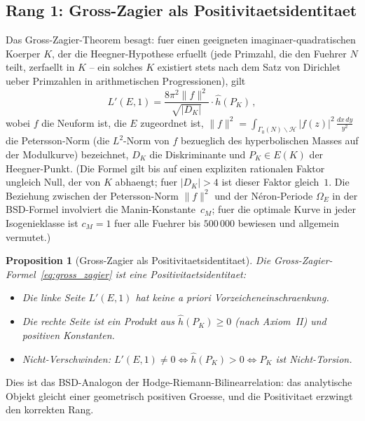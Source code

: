 \documentclass[aps,prd,twocolumn,superscriptaddress,nofootinbib]{revtex4-2}
\newtheorem{proposition}[theorem]{Proposition}
\theoremstyle{definition}
\theoremstyle{remark}
\begin{document}
\subsection{Rang 1: Gross-Zagier als Positivitaetsidentitaet}

Das Gross-Zagier-Theorem \cite{GrossZagier1986} besagt: fuer einen geeigneten imaginaer-quadratischen Koerper $K$, der die Heegner-Hypothese erfuellt (jede Primzahl, die den Fuehrer $N$ teilt, zerfaellt in $K$ -- ein solches $K$ existiert stets nach dem Satz von Dirichlet ueber Primzahlen in arithmetischen Progressionen), gilt
\begin{equation}
L'(E,1) = \frac{8\pi^2 \|f\|^2}{\sqrt{|D_K|}} \cdot \hat{h}(P_K)\,,
\label{eq:gross_zagier}
\end{equation}
wobei $f$ die Neuform ist, die $E$ zugeordnet ist, $\|f\|^2 = \int_{\Gamma_0(N) \backslash \mathcal{H}} |f(z)|^2 \, \frac{dx\,dy}{y^2}$ die Petersson-Norm (die $L^2$-Norm von $f$ bezueglich des hyperbolischen Masses auf der Modulkurve) bezeichnet, $D_K$ die Diskriminante und $P_K \in E(K)$ der Heegner-Punkt. (Die Formel gilt bis auf einen expliziten rationalen Faktor ungleich Null, der von $K$ abhaengt; fuer $|D_K| > 4$ ist dieser Faktor gleich~$1$. Die Beziehung zwischen der Petersson-Norm $\|f\|^2$ und der N\'eron-Periode $\Omega_E$ in der BSD-Formel involviert die Manin-Konstante~$c_M$; fuer die optimale Kurve in jeder Isogenieklasse ist $c_M = 1$ fuer alle Fuehrer bis $500\,000$ bewiesen und allgemein vermutet.)

\begin{proposition}[Gross-Zagier als Positivitaetsidentitaet]
\label{prop:gz_positivity}
Die Gross-Zagier-Formel~\eqref{eq:gross_zagier} ist eine Positivitaetsidentitaet:
\begin{itemize}
\item Die linke Seite $L'(E,1)$ hat keine a priori Vorzeicheneinschraenkung.
\item Die rechte Seite ist ein Produkt aus $\hat{h}(P_K) \geq 0$ (nach Axiom~II) und positiven Konstanten.
\item Nicht-Verschwinden: $L'(E,1) \neq 0 \iff \hat{h}(P_K) > 0 \iff P_K$ ist Nicht-Torsion.
\end{itemize}
\end{proposition}

Dies ist das BSD-Analogon der Hodge-Riemann-Bilinearrelation: das analytische Objekt gleicht einer geometrisch positiven Groesse, und die Positivitaet erzwingt den korrekten Rang.
\end{document}
